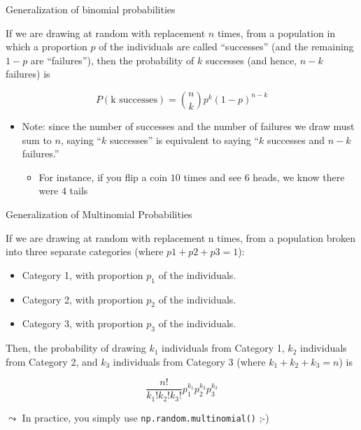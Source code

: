 \documentclass[aspectratio=169]{../latex_main/tntbeamer}  %
\begin{document}
\begin{frame}[c]{Generalization of binomial probabilities}

If we are drawing at random with replacement $n$ times, from a population in which a proportion $p$ of the individuals are called “successes” (and the remaining $1 - p$ are
“failures”), then the probability of $k$ successes (and hence, $n - k$ failures) is

$$P(\text{k successes}) = \binom{n}{k}p^k (1-p)^{n-k}$$

\begin{itemize}
    \item Note: since the number of successes and the number of failures we draw must
sum to $n$, saying “$k$ successes” is equivalent to saying “$k$ successes and $n - k$ failures.”
\begin{itemize}
    \item For instance, if you flip a coin $10$ times and see $6$ heads, we know there were $4$ tails
\end{itemize}

\end{itemize}

\end{frame}

\begin{frame}[c]{Generalization of Multinomial Probabilities}

If we are drawing at random with replacement n times, from a population broken into three separate categories (where $p1 + p2 + p3 = 1$):

\begin{itemize}
    \item Category 1, with proportion $p_1$ of the individuals.
    \item Category 2, with proportion $p_2$ of the individuals.
    \item Category 3, with proportion $p_3$ of the individuals.
\end{itemize}

Then, the probability of drawing $k_1$ individuals from Category 1, $k_2$ individuals from Category 2, and $k_3$ individuals from Category 3 (where $k_1 + k_2 + k_3 = n$) is

$$\frac{n!}{k_1!k_2!k_3!} p_1^{k_1}p_2^{k_2}p_3^{k_3}$$

\pause
$\leadsto$ In practice, you simply use \texttt{np.random.multinomial()} ;-)

\end{frame}
\end{document}
